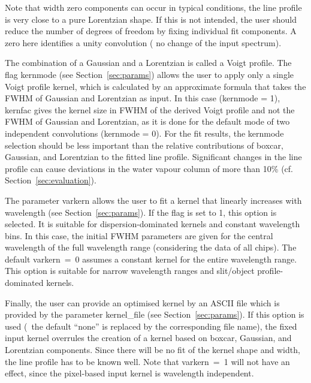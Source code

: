 Note that width zero components can occur in typical conditions, \eg{} the line
profile is very close to a pure Lorentzian shape. If this is not intended, the
user should reduce the number of degrees of freedom by fixing individual fit
components. A zero here identifies a unity convolution (\ie{} no change
of the input spectrum).

The combination of a Gaussian and a Lorentzian is called a Voigt profile. The
flag {\sc kernmode} (see Section~\ref{sec:params}) allows the user to apply
only a single Voigt profile kernel, which is calculated by an approximate
formula that takes the FWHM of Gaussian and Lorentzian as input. In this case
({\sc kernmode} = 1), {\sc kernfac} gives the kernel size in FWHM of the
derived Voigt profile and not the FWHM of Gaussian and Lorentzian, as it is
done for the default mode of two independent convolutions ({\sc kernmode} = 0).
For the fit results, the {\sc kernmode} selection should be less important than
the relative contributions of boxcar, Gaussian, and Lorentzian to the fitted
line profile. Significant changes in the line profile can cause deviations in
the water vapour column of more than 10\% (cf. Section~\ref{sec:evaluation}).

The parameter {\sc varkern} allows the user to fit a kernel that linearly
increases with wavelength (see Section~\ref{sec:params}). If the flag is set to
1, this option is selected. It is suitable for dispersion-dominated kernels and
constant wavelength bins. In this case, the initial FWHM parameters are given
for the central wavelength of the full wavelength range (considering the data
of all chips). The default {\sc varkern}~=~0 assumes a constant kernel for the
entire wavelength range. This option is suitable for narrow wavelength ranges
and slit/object profile-dominated kernels.

Finally, the user can provide an optimised kernel by an ASCII file which is
provided by the parameter {\sc kernel\_file} (see Section~\ref{sec:params}).
If this option is used (\ie\ the default ``none'' is replaced by the
corresponding file name), the fixed input kernel overrules the creation of
a kernel based on boxcar, Gaussian, and Lorentzian components. Since there will
be no fit of the kernel shape and width, the line profile has to be known well.
Note that {\sc varkern}~=~1 will not have an effect, since the pixel-based
input kernel is wavelength independent.
